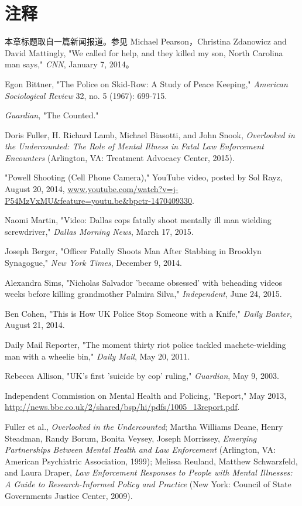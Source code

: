 \documentclass[fontset=fandol, a4paper, 12pt, openright]{ctexbook}
\begin{document}
\section*{注释}
\begin{enumerate}[label={[\arabic*]}]
    \item 本章标题取自一篇新闻报道。参见 Michael Pearson，Christina Zdanowicz and David Mattingly, "We called for help, and they killed my son, North Carolina man says," \textit{CNN}, January 7, 2014。
    \item Egon Bittner, "The Police on Skid-Row: A Study of Peace Keeping," \textit{American Sociological Review} 32, no. 5 (1967): 699-715.
    \item \textit{Guardian}, "The Counted."
    \item Doris Fuller, H. Richard Lamb, Michael Biasotti, and John Snook, \textit{Overlooked in the Undercounted: The Role of Mental Illness in Fatal Law Enforcement Encounters} (Arlington, VA: Treatment Advocacy Center, 2015).
    \item "Powell Shooting (Cell Phone Camera)," YouTube video, posted by Sol Rayz, August 20, 2014, \url{www.youtube.com/watch?v=j-P54MzVxMU&feature=youtu.be&bpctr-1470409330}.
    \item Naomi Martin, "Video: Dallas cops fatally shoot mentally ill man wielding screwdriver," \textit{Dallas Morning News}, March 17, 2015.
    \item Joseph Berger, "Officer Fatally Shoots Man After Stabbing in Brooklyn Synagogue," \textit{New York Times}, December 9, 2014.
    \item Alexandra Sims, "Nicholas Salvador 'became obsessed' with beheading videos weeks before killing grandmother Palmira Silva," \textit{Independent}, June 24, 2015.
    \item Ben Cohen, "This is How UK Police Stop Someone with a Knife," \textit{Daily Banter}, August 21, 2014.
    \item Daily Mail Reporter, "The moment thirty riot police tackled machete-wielding man with a wheelie bin," \textit{Daily Mail}, May 20, 2011.
    \item Rebecca Allison, "UK's first 'suicide by cop' ruling," \textit{Guardian}, May 9, 2003.
    \item Independent Commission on Mental Health and Policing, "Report," May 2013, \url{http://news.bbc.co.uk/2/shared/bsp/hi/pdfs/1005_13report.pdf}.
    \item Fuller et al., \textit{Overlooked in the Undercounted}; Martha Williams Deane, Henry Steadman, Randy Borum, Bonita Veysey, Joseph Morrissey, \textit{Emerging Partnerships Between Mental Health and Law Enforcement} (Arlington, VA: American Psychiatric Association, 1999); Melissa Reuland, Matthew Schwarzfeld, and Laura Draper, \textit{Law Enforcement Responses to People with Mental Illnesses: A Guide to Research-Informed Policy and Practice} (New York: Council of State Governments Justice Center, 2009).

\end{enumerate}
\end{document}
